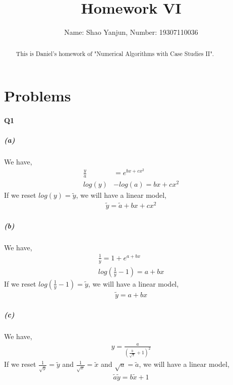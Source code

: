 \documentclass[11pt]{article}
\title{Homework VI}
\author{Name: Shao Yanjun, Number: 19307110036}
\begin{document}
\maketitle

\begin{abstract}
This is Daniel's homework of  "Numerical Algorithms with Case Studies II".
\end{abstract}
\section{Problems}
\paragraph{Q1}
\subparagraph{(a)}
We have,
\begin{align}
	\frac{y}{a}&=e^{bx+cx^2}\\
	log(y)&-log(a)=bx+cx^2
\end{align}
If we reset $log(y)=\tilde{y}$, we will have a linear model,
\begin{align}
	\tilde{y}=\tilde{a}+bx+cx^2
\end{align}
\subparagraph{(b)}
We have,
\begin{align}
	\frac{1}{y}=1+e^{a+bx}\\
	log(\frac{1}{y}-1)=a+bx
\end{align}
If we reset $log(\frac{1}{y}-1)=\tilde{y}$, we will have a linear model,
\begin{align}
	\tilde{y}=a+bx
\end{align}
\subparagraph{(c)}
We have,
\begin{align}
	y=\frac{a}{(\frac{b}{\sqrt{x}}+1)^2}
\end{align}
If we reset $\frac{1}{\sqrt{y}}=\tilde{y}$ and $\frac{1}{\sqrt{x}}=\tilde{x}$ and $\sqrt{a}=\tilde{a}$, we will have a linear model,
\begin{align}
	\tilde{a}\tilde{y}=b\tilde{x}+1
\end{align}
\end{document}
